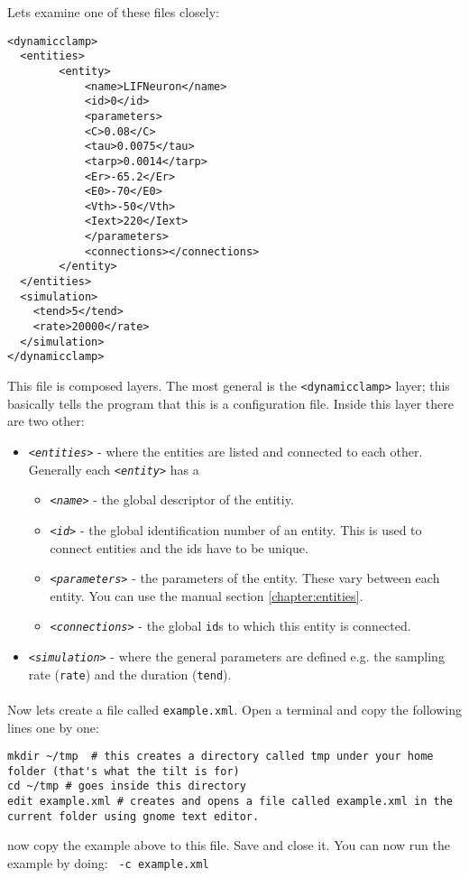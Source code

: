 Lets examine one of these files closely:

\begin{lstlisting}
<dynamicclamp>
  <entities>
    	<entity>
      		<name>LIFNeuron</name>
      		<id>0</id>
      		<parameters>
			<C>0.08</C>
			<tau>0.0075</tau>
			<tarp>0.0014</tarp>
			<Er>-65.2</Er>
			<E0>-70</E0>
			<Vth>-50</Vth>
			<Iext>220</Iext>
      		</parameters>
      		<connections></connections>
    	</entity>
  </entities>
  <simulation>
  	<tend>5</tend>
   	<rate>20000</rate>
  </simulation>
</dynamicclamp>

\end{lstlisting}
 
This file is composed layers. The most general is the \texttt{<dynamicclamp>} layer; this basically tells the program that this is a configuration file. Inside this layer there are two other:
\begin{itemize}
\item
\emph{ \texttt{<entities>}}  - where the entities are listed and connected to each other. Generally each \emph{ \texttt{<entity>}} has a 
	\begin{itemize}
	\item \emph{ \texttt{<name>}} - the global descriptor of the entitiy. 
	\item \emph{ \texttt{<id>}} - the global identification number of an entity. This is used to connect entities and the ids have to be unique.
	\item \emph{ \texttt{<parameters>}} - the parameters of the entity. These vary between each entity. You can use the manual section \ref{chapter:entities}.
	\item \emph{ \texttt{<connections>}} - the global \texttt{id}s to which this entity is connected.
	\end{itemize}
\item
\emph{ \texttt{<simulation>}} - where the general parameters are defined e.g. the sampling rate (\texttt{rate}) and the duration (\texttt{tend}).
\end{itemize}

\paragraph{}
Now lets create a file called \texttt{example.xml}. Open a terminal and copy the following lines one by one:

\begin{lstlisting}
mkdir ~/tmp  # this creates a directory called tmp under your home folder (that's what the tilt is for)
cd ~/tmp # goes inside this directory
edit example.xml # creates and opens a file called example.xml in the current folder using gnome text editor.
\end{lstlisting}
now copy the example above to this file. Save and close it. You can now run the example by doing: \texttt{\progname\ -c example.xml}

